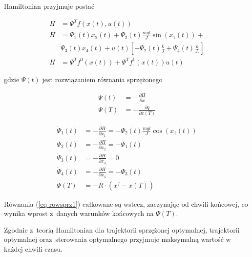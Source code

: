 \documentclass[11pt]{mwart}
\begin{document}
Hamiltonian przyjmuje postać

\begin{equation}
	\label{eq-ham}
	\begin{split}
		H &= \Psi^Tf\left(x\left(t\right),u\left(t\right)\right) \\
		H &= \Psi_{1}\left(t\right)x_{2}\left(t\right) + 
		\Psi_{2}\left(t\right)\frac{mgl}{J}\sin\left(x_{1}\left(t\right)\right) +\\
		& \Psi_{3}\left(t\right)x_{4}\left(t\right) +
		u\left(t\right)\left[-\Psi_{2}\left(t\right)\frac{k}{J}+\Psi_{4}\left(t\right)\frac{k}{J_{r}}\right] \\
		H &= \Psi^Tf^0\left(x\left(t\right)\right)+\Psi^Tf^1\left(x\left(t\right)\right)u\left(t\right)
	\end{split}
\end{equation}

gdzie $\Psi\left(t\right)$ jest rozwiązaniem równania sprzężonego

\begin{equation}
	\label{eq-rowsprz}
	\begin{split}
		\dot{\Psi}\left(t\right) &= -\frac{\partial H}{\partial x} \\
		\Psi\left(T\right) &= -\frac{\partial q}{\partial x\left(T\right)}
	\end{split}
\end{equation}

\begin{equation}
	\label{eq-rowsprz1}
	\begin{split}
		\dot{\Psi}_{1}\left(t\right) &= -\frac{\partial H}{\partial x_{1}} = -\Psi_{2}\left(t\right)\frac{mgl}{J}\cos\left(x_{1}\left(t\right)\right) \\
		\dot{\Psi}_{2}\left(t\right) &= -\frac{\partial H}{\partial x_{2}} = -\Psi_{1}\left(t\right) \\
		\dot{\Psi}_{3}\left(t\right) &= -\frac{\partial H}{\partial x_{3}} = 0 \\
		\dot{\Psi}_{4}\left(t\right) &= -\frac{\partial H}{\partial x_{4}} = -\Psi_{3}\left(t\right) \\
		\Psi\left(T\right) &= -R\cdot\left(x^f-x\left(T\right)\right)
	\end{split}
\end{equation}

Równania (\ref{eq-rowsprz1}) całkowane są wstecz, zaczynając od chwili końcowej, co wynika wprost z~danych warunków końcowych na $\Psi\left(T\right)$.

Zgodnie z~teorią Hamiltonian dla trajektorii sprzężonej optymalnej, trajektorii optymalnej oraz~sterowania optymalnego przyjmuje maksymalną wartość w każdej chwili czasu.
\end{document}
